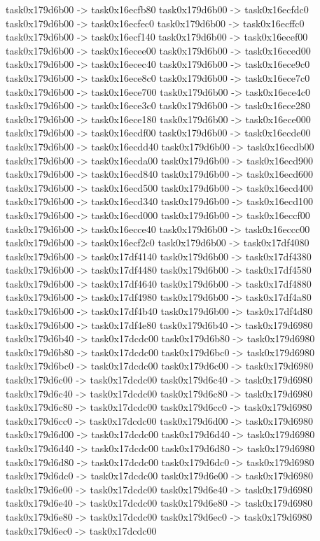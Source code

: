 {	task0x179d6b00 -> task0x16ecfb80
	task0x179d6b00 -> task0x16ecfdc0
	task0x179d6b00 -> task0x16ecfec0
	task0x179d6b00 -> task0x16ecffc0
	task0x179d6b00 -> task0x16ecf140
	task0x179d6b00 -> task0x16ecef00
	task0x179d6b00 -> task0x16ecee00
	task0x179d6b00 -> task0x16eced00
	task0x179d6b00 -> task0x16ecec40
	task0x179d6b00 -> task0x16ece9c0
	task0x179d6b00 -> task0x16ece8c0
	task0x179d6b00 -> task0x16ece7c0
	task0x179d6b00 -> task0x16ece700
	task0x179d6b00 -> task0x16ece4c0
	task0x179d6b00 -> task0x16ece3c0
	task0x179d6b00 -> task0x16ece280
	task0x179d6b00 -> task0x16ece180
	task0x179d6b00 -> task0x16ece000
	task0x179d6b00 -> task0x16ecdf00
	task0x179d6b00 -> task0x16ecde00
	task0x179d6b00 -> task0x16ecdd40
	task0x179d6b00 -> task0x16ecdb00
	task0x179d6b00 -> task0x16ecda00
	task0x179d6b00 -> task0x16ecd900
	task0x179d6b00 -> task0x16ecd840
	task0x179d6b00 -> task0x16ecd600
	task0x179d6b00 -> task0x16ecd500
	task0x179d6b00 -> task0x16ecd400
	task0x179d6b00 -> task0x16ecd340
	task0x179d6b00 -> task0x16ecd100
	task0x179d6b00 -> task0x16ecd000
	task0x179d6b00 -> task0x16eccf00
	task0x179d6b00 -> task0x16ecce40
	task0x179d6b00 -> task0x16eccc00
	task0x179d6b00 -> task0x16ecf2c0
	task0x179d6b00 -> task0x17df4080
	task0x179d6b00 -> task0x17df4140
	task0x179d6b00 -> task0x17df4380
	task0x179d6b00 -> task0x17df4480
	task0x179d6b00 -> task0x17df4580
	task0x179d6b00 -> task0x17df4640
	task0x179d6b00 -> task0x17df4880
	task0x179d6b00 -> task0x17df4980
	task0x179d6b00 -> task0x17df4a80
	task0x179d6b00 -> task0x17df4b40
	task0x179d6b00 -> task0x17df4d80
	task0x179d6b00 -> task0x17df4e80
	task0x179d6b40 -> task0x179d6980
	task0x179d6b40 -> task0x17dcdc00
	task0x179d6b80 -> task0x179d6980
	task0x179d6b80 -> task0x17dcdc00
	task0x179d6bc0 -> task0x179d6980
	task0x179d6bc0 -> task0x17dcdc00
	task0x179d6c00 -> task0x179d6980
	task0x179d6c00 -> task0x17dcdc00
	task0x179d6c40 -> task0x179d6980
	task0x179d6c40 -> task0x17dcdc00
	task0x179d6c80 -> task0x179d6980
	task0x179d6c80 -> task0x17dcdc00
	task0x179d6cc0 -> task0x179d6980
	task0x179d6cc0 -> task0x17dcdc00
	task0x179d6d00 -> task0x179d6980
	task0x179d6d00 -> task0x17dcdc00
	task0x179d6d40 -> task0x179d6980
	task0x179d6d40 -> task0x17dcdc00
	task0x179d6d80 -> task0x179d6980
	task0x179d6d80 -> task0x17dcdc00
	task0x179d6dc0 -> task0x179d6980
	task0x179d6dc0 -> task0x17dcdc00
	task0x179d6e00 -> task0x179d6980
	task0x179d6e00 -> task0x17dcdc00
	task0x179d6e40 -> task0x179d6980
	task0x179d6e40 -> task0x17dcdc00
	task0x179d6e80 -> task0x179d6980
	task0x179d6e80 -> task0x17dcdc00
	task0x179d6ec0 -> task0x179d6980
	task0x179d6ec0 -> task0x17dcdc00
}
